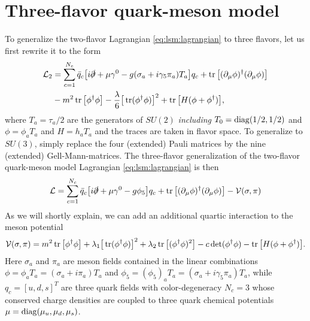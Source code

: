 \section{Three-flavor quark-meson model}


To generalize the two-flavor Lagrangian \eqref{eq:lsm:lagrangian} to three flavors, let us first rewrite it to the form
\begin{equation}
\begin{split}
	\mathcal{L}_2 &= \sum_{c=1}^{N_c} \bar{q}_c \big[ i \slashed\partial + \mu \gamma^0 - g (\sigma_a + i \gamma_5 \pi_a ) T_a \big] q_c + \operatorname{tr}\big[(\partial_\mu \phi)^\dagger (\partial_\mu \phi)\big] \\
	        &- m^2 \operatorname{tr}\big[\phi^\dagger \phi\big] - \frac{\lambda}{6} \big[\operatorname{tr}(\phi^\dagger \phi)\big]^2 + \operatorname{tr}\big[H(\phi+\phi^\dagger)\big],
\end{split}
\end{equation}
where $T_a = \tau_a / 2$ are the generators of $SU(2)$ \emph{including} $T_0 = \operatorname{diag} (1/2, 1/2)$ and $\phi = \phi_a T_a$ and $H = h_a T_a$ and the traces are taken in flavor space.
To generalize to $SU(3)$, simply replace the four (extended) Pauli matrices by the nine (extended) Gell-Mann-matrices.
The three-flavor generalization of the two-flavor quark-meson model Lagrangian \eqref{eq:lsm:lagrangian} is then
\begin{equation}
	\mathcal{L} = \sum_{c=1}^{N_c} \bar{q}_c \big[ i \slashed\partial + \mu \gamma^0 - g \phi_5 \big] q_c + \operatorname{tr}\big[(\partial_\mu \phi)^\dagger (\partial_\mu \phi)\big] - \mathcal{V}(\sigma, \pi)
\label{eq:lsm:lagrangian3f}
\end{equation}
As we will shortly explain, we can add an additional quartic interaction to the meson potential
\begin{equation}
	\mathcal{V}(\sigma, \pi) = m^2 \operatorname{tr}\big[\phi^\dagger \phi\big] + \lambda_1 \big[\operatorname{tr}(\phi^\dagger \phi)\big]^2 + \lambda_2 \operatorname{tr}\big[(\phi^\dagger \phi)^2\big] - c \operatorname{det}(\phi^\dagger \phi) - \operatorname{tr}\big[H(\phi+\phi^\dagger)\big].
\label{eq:lsm:potential3f}
\end{equation}
Here $\sigma_a$ and $\pi_a$ are meson fields contained in the linear combinations $\phi = \phi_a T_a = (\sigma_a + i \pi_a) T_a$ and $\phi_5 = (\phi_5)_a T_a = (\sigma_a + i \gamma_5 \pi_a) T_a$,
while $q_c = [u, d, s]^T$ are three quark fields with color-degeneracy $N_c=3$ whose conserved charge densities are coupled to three quark chemical potentials $\mu = \operatorname{diag}(\mu_u, \mu_d, \mu_s)$.
